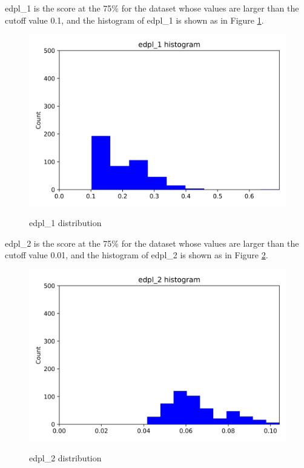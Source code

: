 \documentclass{article}
\begin{document}
edpl_1 is the score at the 75\% for the dataset whose values are larger than the cutoff value 0.1, and the histogram of edpl_1 is shown as in Figure \ref{edpl_1-communitylevel}.
\begin{figure}[htbp]
	\centering
	\includegraphics[width=\textwidth, keepaspectratio]{edpl_1-communitylevel.png}\\
	\caption{edpl_1 distribution}
	\label{edpl_1-communitylevel}
\end{figure}
edpl_2 is the score at the 75\% for the dataset whose values are larger than the cutoff value 0.01, and the histogram of edpl_2 is shown as in Figure  \ref{edpl_2-communitylevel}.
\begin{figure}[htbp]
	\centering
	\includegraphics[width=\textwidth, keepaspectratio]{edpl_2-communitylevel.png}\\
	\caption{edpl_2 distribution}
	\label{edpl_2-communitylevel}
\end{figure}
\end{document}
